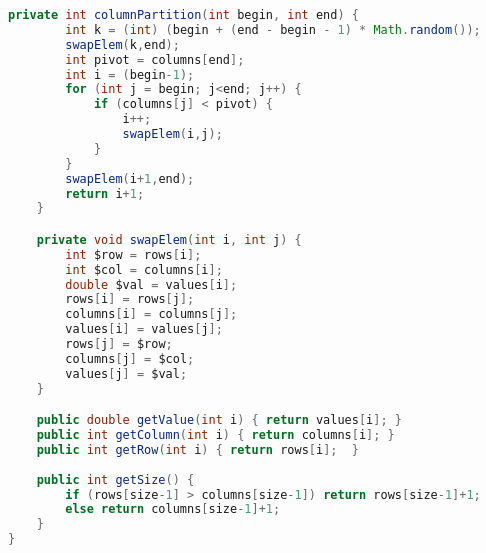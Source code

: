 \documentclass[12pt]{article}
\begin{document}
\begin{lstlisting}[language=Java]
	private int columnPartition(int begin, int end) {
		int k = (int) (begin + (end - begin - 1) * Math.random());
		swapElem(k,end);
		int pivot = columns[end];
		int i = (begin-1);
		for (int j = begin; j<end; j++) {
			if (columns[j] < pivot) {
				i++;
				swapElem(i,j);
			}
		}
		swapElem(i+1,end);
		return i+1;
	}

	private void swapElem(int i, int j) {
		int $row = rows[i];
		int $col = columns[i];
		double $val = values[i];
		rows[i] = rows[j];
		columns[i] = columns[j];
		values[i] = values[j];
		rows[j] = $row;
		columns[j] = $col;
		values[j] = $val;
	}

	public double getValue(int i) {	return values[i]; }
	public int getColumn(int i) { return columns[i]; }
	public int getRow(int i) { return rows[i];	}
	
	public int getSize() {
		if (rows[size-1] > columns[size-1]) return rows[size-1]+1;
		else return columns[size-1]+1;
	}
}
\end{lstlisting}
\newpage
\end{document}
